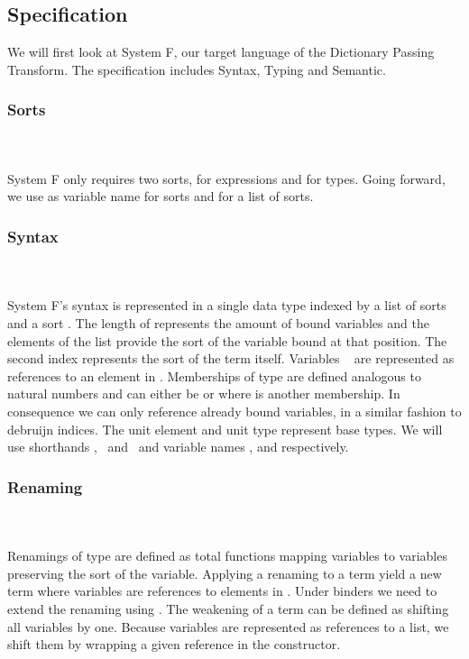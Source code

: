 \subsection{Specification}
We will first look at System F, our target language of the Dictionary Passing Transform. The specification includes Syntax, Typing and Semantic. 
\subsubsection{Sorts}\hfill\\\\
System F only requires two sorts,  for expressions and  for types. 
\FSort
Going forward, we use  as variable name for sorts and  for a list of sorts.
\subsubsection{Syntax}\hfill\\\\
System F's syntax is represented in a single data type  indexed by a list of sorts  and a sort . The length of  represents the amount of bound variables and the elements  of the list provide the sort of the variable bound at that position. The second index  represents the sort of the term itself.
\FTerm
Variables \  are represented as references    to an element in . Memberships of type    are defined analogous to natural numbers and can either be  or   where  is another membership. In consequence we can only reference already bound variables, in a similar fashion to debruijn indices. The unit element  and unit type  represent base types. 
We will use shorthands \FVar, \FExpr\ and \FType\ and variable names ,  and  respectively.
\subsubsection{Renaming}\hfill\\\\
Renamings  of type    are defined as total functions mapping variables    to variables    preserving the sort  of the variable.
\FRen
Applying a renaming    to a term    yield a new term    where variables are references to elements in .
\Fren
Under binders we need to extend the renaming using \Frenext. The weakening of a term can be defined as shifting all variables by one.
\Fwk 
Because variables are represented as references to a list, we shift them by wrapping a given reference in the  constructor.

